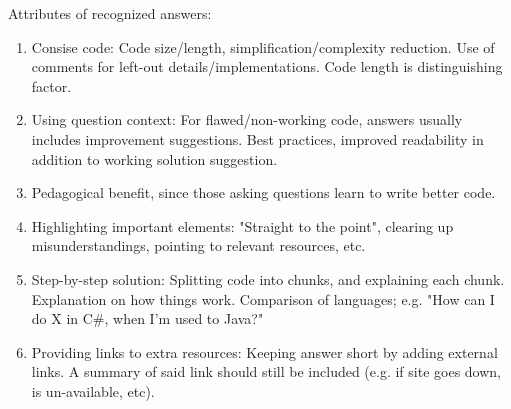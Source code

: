 Attributes of recognized answers:
\begin{enumerate}
	\item Consise code: 
	Code size/length, simplification/complexity reduction. 
	Use of comments for left-out details/implementations. 
	Code length is distinguishing factor.
	\item Using question context: 
	For flawed/non-working code, answers usually includes improvement suggestions. 
	Best practices, improved readability in addition to working solution suggestion.
	\item Pedagogical benefit, since those asking questions learn to write better code.
	\item Highlighting important elements: 
	"Straight to the point", clearing up misunderstandings, pointing to relevant resources, etc.
	\item Step-by-step solution: 
	Splitting code into chunks, and explaining each chunk. 
	Explanation on how things work. 
	Comparison of languages; e.g. "How can I do X in C\#, when I'm used to Java?"
	\item Providing links to extra resources: 
	Keeping answer short by adding external links. 
	A summary of said link should still be included (e.g. if site goes down, is un-available, etc).
\end{enumerate}
\cite{Nasehi2012}



